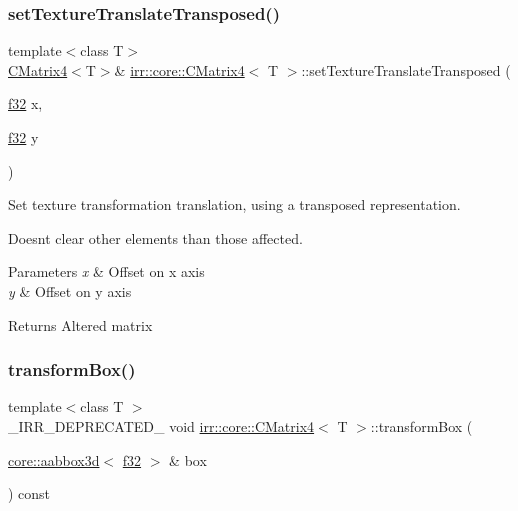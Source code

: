 \subsubsection{\texorpdfstring{set\+Texture\+Translate\+Transposed()}{setTextureTranslateTransposed()}\hspace{0.1cm}{\footnotesize\ttfamily [2/2]}}
{\footnotesize\ttfamily template$<$class T$>$ \\
\hyperlink{classirr_1_1core_1_1CMatrix4}{C\+Matrix4}$<$T$>$\& \hyperlink{classirr_1_1core_1_1CMatrix4}{irr\+::core\+::\+C\+Matrix4}$<$ T $>$\+::set\+Texture\+Translate\+Transposed (\begin{DoxyParamCaption}\item[{\hyperlink{namespaceirr_a0277be98d67dc26ff93b1a6a1d086b07}{f32}}]{x,  }\item[{\hyperlink{namespaceirr_a0277be98d67dc26ff93b1a6a1d086b07}{f32}}]{y }\end{DoxyParamCaption})}



Set texture transformation translation, using a transposed representation. 

Doesn\textquotesingle{}t clear other elements than those affected. 
\begin{DoxyParams}{Parameters}
{\em x} & Offset on x axis \\
\hline
{\em y} & Offset on y axis \\
\hline
\end{DoxyParams}
\begin{DoxyReturn}{Returns}
Altered matrix 
\end{DoxyReturn}
\mbox{\label{classirr_1_1core_1_1CMatrix4_a0e6a0a3b1b20aac7313806fdb1a01316}} 
\subsubsection{\texorpdfstring{transform\+Box()}{transformBox()}\hspace{0.1cm}{\footnotesize\ttfamily [1/2]}}
{\footnotesize\ttfamily template$<$class T $>$ \\
\+\_\+\+I\+R\+R\+\_\+\+D\+E\+P\+R\+E\+C\+A\+T\+E\+D\+\_\+ void \hyperlink{classirr_1_1core_1_1CMatrix4}{irr\+::core\+::\+C\+Matrix4}$<$ T $>$\+::transform\+Box (\begin{DoxyParamCaption}\item[{\hyperlink{classirr_1_1core_1_1aabbox3d}{core\+::aabbox3d}$<$ \hyperlink{namespaceirr_a0277be98d67dc26ff93b1a6a1d086b07}{f32} $>$ \&}]{box }\end{DoxyParamCaption}) const\hspace{0.3cm}{\ttfamily [inline]}}



